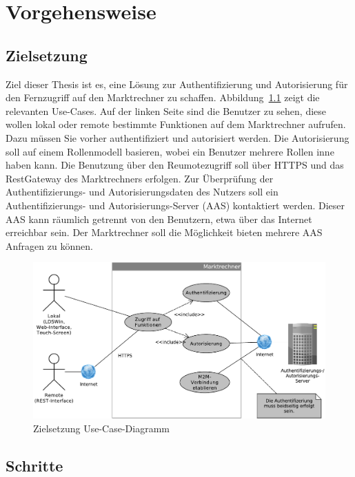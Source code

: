 \documentclass[11pt,a4paper]{report}
\begin{document}
\chapter{Vorgehensweise}

\section{Zielsetzung}

Ziel dieser Thesis ist es, eine Lösung zur Authentifizierung und Autorisierung für den Fernzugriff auf den Marktrechner zu schaffen. Abbildung~\ref{fig:uc_solution} zeigt die relevanten Use-Cases. Auf der linken Seite sind die Benutzer zu sehen, diese wollen lokal oder remote bestimmte Funktionen auf dem Marktrechner aufrufen. Dazu müssen Sie vorher authentifiziert und autorisiert werden. Die Autorisierung soll auf einem Rollenmodell basieren, wobei ein Benutzer mehrere Rollen inne haben kann. Die Benutzung über den Reumotezugriff soll über HTTPS und das RestGateway des Marktrechners erfolgen. Zur Überprüfung der Authentifizierungs- und Autorisierungsdaten des Nutzers soll ein Authentifizierungs- und  Autorisierungs-Server (AAS) kontaktiert werden. Dieser AAS kann räumlich getrennt von den Benutzern, etwa über das Internet erreichbar sein. Der Marktrechner soll die Möglichkeit bieten mehrere AAS Anfragen zu können.

\begin{figure}[htbp]
\centering
\includegraphics[scale=0.6]{images/ziel_usecase.pdf}
\caption{Zielsetzung Use-Case-Diagramm}
\label{fig:uc_solution}
\end{figure}

\section{Schritte}
\end{document}
